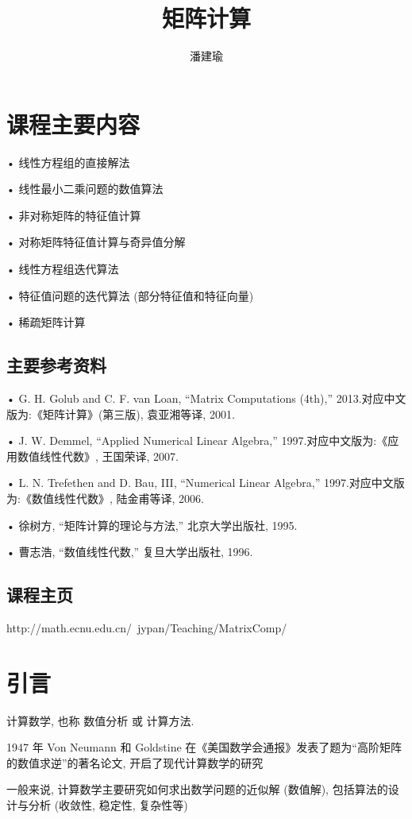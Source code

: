 \documentclass[12pt,a4paper]{article}
\title{矩阵计算}
\author{潘建瑜}
\begin{document}
\maketitle
\newpage
\section{课程主要内容}

• 线性方程组的直接解法

• 线性最小二乘问题的数值算法

• 非对称矩阵的特征值计算

• 对称矩阵特征值计算与奇异值分解

• 线性方程组迭代算法

• 特征值问题的迭代算法 (部分特征值和特征向量)

• 稀疏矩阵计算

\subsection*{主要参考资料}

• G. H. Golub and C. F. van Loan, “Matrix Computations (4th),” 2013.对应中文版为:《矩阵计算》(第三版), 袁亚湘等译, 2001.

• J. W. Demmel, “Applied Numerical Linear Algebra,” 1997.对应中文版为:《应用数值线性代数》, 王国荣译, 2007.

• L. N. Trefethen and D. Bau, III, “Numerical Linear Algebra,” 1997.对应中文版为:《数值线性代数》, 陆金甫等译, 2006.

• 徐树方, “矩阵计算的理论与方法,” 北京大学出版社, 1995.

• 曹志浩, “数值线性代数,” 复旦大学出版社, 1996.

\subsection*{课程主页}

http://math.ecnu.edu.cn/~jypan/Teaching/MatrixComp/

\newpage
\section{引言}
计算数学, 也称 数值分析 或 计算方法.

1947 年 Von Neumann 和 Goldstine 在《美国数学会通报》发表了题为“高阶矩阵的数值求逆”的著名论文, 开启了现代计算数学的研究

一般来说, 计算数学主要研究如何求出数学问题的近似解 (数值解), 包括算法的设计与分析 (收敛性, 稳定性, 复杂性等)
\end{document}

